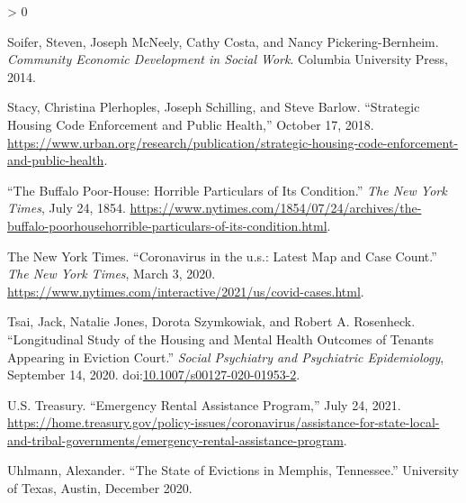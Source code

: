 \documentclass[
  openany]{book}
\newlength{\cslhangindent}
\newenvironment{CSLReferences}[2] %
 {%
  \setlength{\parindent}{0pt}
  \ifodd #1 \everypar{\setlength{\hangindent}{\cslhangindent}}\ignorespaces\fi
  \ifnum #2 > 0
  \setlength{\parskip}{#2\baselineskip}
  \fi
 }%
 {}
\begin{document}
\begin{CSLReferences}{1}{0}
\leavevmode\hypertarget{ref-soifer2014}{}%
Soifer, Steven, Joseph McNeely, Cathy Costa, and Nancy Pickering-Bernheim. \emph{Community Economic Development in Social Work}. Columbia University Press, 2014.

\leavevmode\hypertarget{ref-stacy2018}{}%
Stacy, Christina Plerhoples, Joseph Schilling, and Steve Barlow. {``Strategic Housing Code Enforcement and Public Health,''} October 17, 2018. \url{https://www.urban.org/research/publication/strategic-housing-code-enforcement-and-public-health}.

\leavevmode\hypertarget{ref-thebuff1854}{}%
{``The Buffalo Poor-House: Horrible Particulars of Its Condition.''} \emph{The New York Times}, July 24, 1854. \url{https://www.nytimes.com/1854/07/24/archives/the-buffalo-poorhousehorrible-particulars-of-its-condition.html}.

\leavevmode\hypertarget{ref-thenewyorktimes2020}{}%
The New York Times. {``Coronavirus in the u.s.: Latest Map and Case Count.''} \emph{The New York Times}, March 3, 2020. \url{https://www.nytimes.com/interactive/2021/us/covid-cases.html}.

\leavevmode\hypertarget{ref-tsai2020}{}%
Tsai, Jack, Natalie Jones, Dorota Szymkowiak, and Robert A. Rosenheck. {``Longitudinal Study of the Housing and Mental Health Outcomes of Tenants Appearing in Eviction Court.''} \emph{Social Psychiatry and Psychiatric Epidemiology}, September 14, 2020. doi:\href{https://doi.org/10.1007/s00127-020-01953-2}{10.1007/s00127-020-01953-2}.

\leavevmode\hypertarget{ref-u.s.treasury2021}{}%
U.S. Treasury. {``Emergency Rental Assistance Program,''} July 24, 2021. \url{https://home.treasury.gov/policy-issues/coronavirus/assistance-for-state-local-and-tribal-governments/emergency-rental-assistance-program}.

\leavevmode\hypertarget{ref-uhlmann2020}{}%
Uhlmann, Alexander. {``The State of Evictions in Memphis, Tennessee.''} University of Texas, Austin, December 2020.

\end{CSLReferences}
\end{document}
